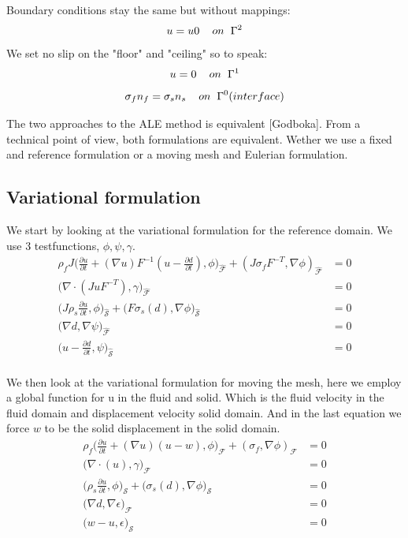 Boundary conditions stay the same but without mappings:
$$ u = u0 \hspace{4mm}on \hspace{2mm} \Gamma^2$$
We set no slip on the "floor" and "ceiling" so to speak:
$$ u = 0  \hspace{4mm}on \hspace{2mm} \Gamma^1  $$
$$  \sigma_f n_f = \sigma_s n_s \hspace{4mm} on  \hspace{2mm}\Gamma^0 (interface)   $$

The two approaches to the ALE method is equivalent [Godboka]. 
From a technical point of view, both formulations are equivalent. Wether we use a fixed and reference formulation or a moving mesh and Eulerian formulation. 
\subsection*{Variational formulation}
We start by looking at the variational formulation for the reference domain.
We use 3 testfunctions, $\phi, \psi, \gamma$.
\begin{align*}
\rho_f J \big( \frac{\partial u}{\partial t} + (\nabla u)F^{-1}(u-\frac{\partial d}{\partial t}) , \phi\big)_{\mathcal{\hat{F}}} + (J\sigma_f F^{-T},\nabla \phi )_{\mathcal{\hat{F}}} &= 0  \\
 \big( \nabla \cdot (J u F^{-T}),\gamma \big)_{\mathcal{\hat{F}}} &= 0 \\
\big(J\rho_s \frac{\partial u}{\partial t},\phi \big)_{\mathcal{\hat{S}}} + \big(F \sigma_s(d), \nabla \phi \big)_{\mathcal{\hat{S}}} &=0 \\
 \big( \nabla d , \nabla \psi \big)_{\mathcal{\hat{F}}} &= 0 \\
 \big( u- \frac{\partial d}{\partial t} ,\psi \big)_{\mathcal{\hat{S}}} &= 0 \\
\end{align*}

We then look at the variational formulation for moving the mesh, here we employ a global function for u in the fluid and solid. Which is the fluid velocity in the fluid domain and displacement velocity solid domain. And in the last equation we force $w$ to be the solid displacement in the solid domain.
\begin{align*}
\rho_f \big( \frac{\partial u}{\partial t} + (\nabla u)(u-w) , \phi\big)_{\mathcal{F}} + (\sigma_f ,\nabla \phi )_{\mathcal{F}} &= 0  \\
 \big( \nabla \cdot (u ),\gamma \big)_{\mathcal{F}} &= 0 \\
\big(\rho_s \frac{\partial u}{\partial t},\phi \big)_{\mathcal{S}} + \big( \sigma_s(d), \nabla \phi \big)_{\mathcal{S}} &=0 \\
 \big( \nabla d , \nabla \epsilon \big)_{\mathcal{F}} &= 0 \\
 \big( w- u,\epsilon \big)_{\mathcal{S}} &= 0 \\
\end{align*}



